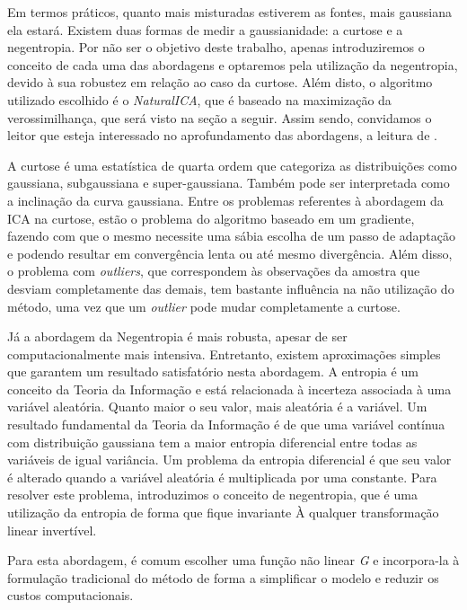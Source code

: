     \medskip
    
    Em termos práticos, quanto mais misturadas estiverem as fontes, mais gaussiana ela estará. Existem duas formas de medir a gaussianidade: a curtose e a negentropia. Por não ser o objetivo deste trabalho, apenas introduziremos o conceito de cada uma das abordagens e optaremos pela utilização da negentropia, devido à sua robustez em relação ao caso da curtose. Além disto, o algoritmo utilizado escolhido é o \textit{NaturalICA}, que é baseado na maximização da verossimilhança, que será visto na seção a seguir. Assim sendo, convidamos o leitor que esteja interessado no aprofundamento das abordagens, a leitura de \cite{LuizVictorio}.
    
    A curtose é uma estatística de quarta ordem que categoriza as distribuições como gaussiana, subgaussiana e super-gaussiana. Também pode ser interpretada como a inclinação da curva gaussiana. Entre os problemas referentes à abordagem da ICA na curtose, estão o problema do algoritmo baseado em um gradiente, fazendo com que o mesmo necessite uma sábia escolha de um passo de adaptação e podendo resultar em convergência lenta ou até mesmo divergência. Além disso, o problema com \textit{outliers}, que correspondem às observações da amostra que desviam completamente das demais, tem bastante influência na não utilização do método, uma vez que um \textit{outlier} pode mudar completamente a curtose.
    
    Já a abordagem da Negentropia é mais robusta, apesar de ser computacionalmente mais intensiva. Entretanto, existem aproximações simples que garantem um resultado satisfatório nesta abordagem. A entropia é um conceito da Teoria da Informação e está relacionada à incerteza associada à uma variável aleatória. Quanto maior o seu valor, mais aleatória é a variável. Um resultado fundamental da Teoria da Informação é de que uma variável contínua com distribuição gaussiana tem a maior entropia diferencial entre todas as variáveis de igual variância. Um problema da entropia diferencial é que seu valor é alterado quando a variável aleatória é multiplicada por uma constante. Para resolver este problema, introduzimos o conceito de negentropia, que é uma utilização da entropia de forma que fique invariante À qualquer transformação linear invertível. 
    
    Para esta abordagem, é comum escolher uma função não linear \textit{G} e incorpora-la à formulação tradicional do método de forma a simplificar o modelo e reduzir os custos computacionais.
    
